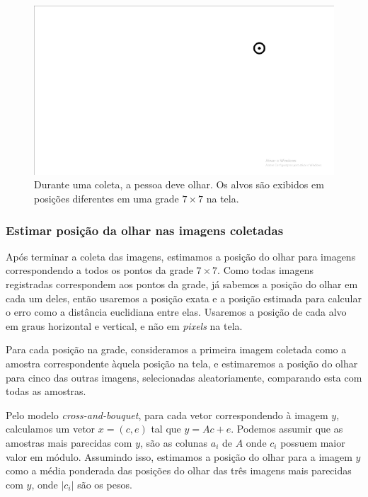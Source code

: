 \begin{figure}
\centering
\includegraphics[scale=1]{imagens/alvo.png}
\caption{Durante uma coleta, a pessoa deve olhar. Os alvos são exibidos em posições diferentes em uma grade $7 \times 7$ na tela.}
\label{fig:alvo}
\end{figure}

\subsubsection{Estimar posição da olhar nas imagens coletadas}

Após terminar a coleta das imagens, estimamos a posição do olhar para imagens correspondendo a todos os pontos da grade $7 \times 7$. Como todas imagens registradas correspondem aos pontos da grade, já sabemos a posição do olhar em cada um deles, então usaremos a posição exata e a posição estimada para calcular o erro como a distância euclidiana entre elas. Usaremos a posição de cada alvo em graus horizontal e vertical, e não em \textit{pixels} na tela.

Para cada posição na grade, consideramos a primeira imagem coletada como a amostra correspondente àquela posição na tela, e estimaremos a posição do olhar para cinco das outras imagens, selecionadas aleatoriamente, comparando esta com todas as amostras.

Pelo modelo \textit{cross-and-bouquet}, para cada vetor correspondendo à imagem $y$, calculamos um vetor $x = (c, e)$ tal que $y = Ac + e$. Podemos assumir que as amostras mais parecidas com $y$, são as colunas $a_i$ de $A$ onde $c_i$ possuem maior valor em módulo. Assumindo isso, estimamos a posição do olhar para a imagem $y$ como a média ponderada das posições do olhar das três imagens mais parecidas com $y$, onde $\vert c_i \vert$ são os pesos.

